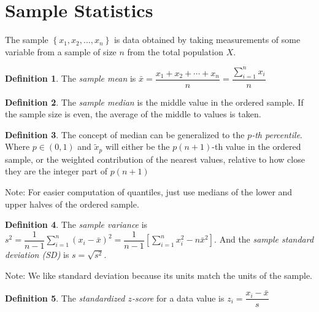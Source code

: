 \documentclass[10pt]{article}
\theoremstyle{definition}
\newtheorem*{definition}{Definition}
\theoremstyle{theorem}
\newcommand{\ds}{\displaystyle}
\begin{document}
\section*{Sample Statistics}
The sample \(\left\{x_1, x_2, \ldots, x_n\right\}\) is data obtained by taking measurements of some variable from a sample of size \(n\) from the total population \(X\).

\begin{definition}
	The \emph{sample mean} is \(\bar{x}= \dfrac{x_1+x_2+\cdots+x_n}{n}=\dfrac{\sum_{i=1}^{n}x_i}{n}\)
\end{definition}

\begin{definition}
	The \emph{sample median} is the middle value in the ordered sample. If the sample size is even, the average of the middle to values is taken.
\end{definition}

\begin{definition}
	The concept of median can be generalized to the \emph{\(p\)-th percentile}. Where \(p\in (0,1)\) and \(\tilde{x}_p\) will either be the \(p(n+1)\)-th value in the ordered sample, or the weighted contribution of the nearest values, relative to how close they are the integer part of \(p(n+1)\)
\end{definition}

Note: For easier computation of quantiles, just use medians of the lower and upper halves of the ordered sample.

\begin{definition}
	The \emph{sample variance} is \(s^2=\dfrac{1}{n-1}\ds\sum_{i=1}^{n}(x_i - \bar{x})^2 = \dfrac{1}{n-1}\left[\sum_{i=1}^{n}x_i^2 - n\bar{x}^2\right]\). And the \emph{sample standard deviation (SD)} is \(s=\sqrt{s^2}\).
\end{definition}

Note: We like standard deviation because its units match the units of the sample.

\begin{definition}
	The \emph{standardized \(z\)-score} for a data value is \(z_i = \dfrac{x_i - \bar{x}}{s}\)
\end{definition}
\end{document}
